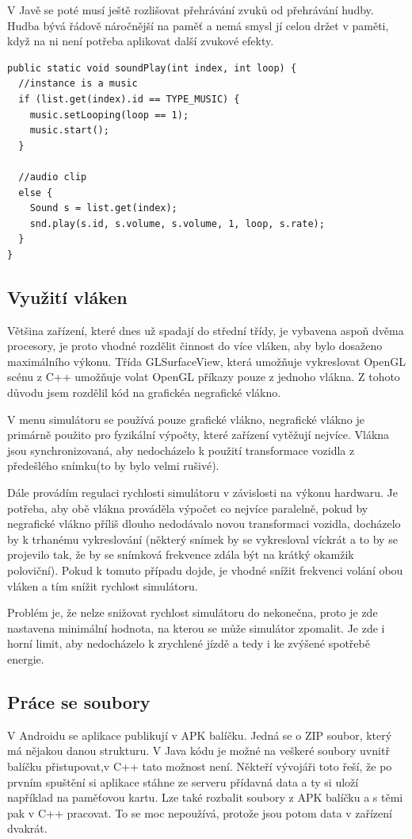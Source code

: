 \documentclass[11pt,twoside,a4paper]{book}
\begin{document}
V Javě se poté musí ještě rozlišovat přehrávání zvuků od přehrávání hudby. Hudba bývá řádově náročnější na paměť a nemá smysl jí celou držet v paměti, když na ni není potřeba aplikovat další zvukové efekty.

\lstset{language=Java} 
\begin{lstlisting}[caption=Přehrání zvuku v Javě pomocí Android API]  
public static void soundPlay(int index, int loop) {
  //instance is a music
  if (list.get(index).id == TYPE_MUSIC) {
    music.setLooping(loop == 1);
    music.start();
  }

  //audio clip
  else {
    Sound s = list.get(index);
    snd.play(s.id, s.volume, s.volume, 1, loop, s.rate);
  }
}
\end{lstlisting}

\subsection{Využití vláken}
Většina zařízení, které dnes už spadají do střední třídy, je vybavena aspoň dvěma procesory, je proto vhodné rozdělit činnost do více vláken, aby bylo dosaženo maximálního výkonu. Třída GLSurfaceView, která umožňuje vykreslovat OpenGL scénu z C++ umožňuje volat OpenGL příkazy pouze z jednoho vlákna. Z tohoto důvodu jsem rozdělil kód na grafické\linebreak a negrafické vlákno.

V menu simulátoru se používá pouze grafické vlákno, negrafické vlákno je primárně použito pro fyzikální výpočty, které zařízení vytěžují nejvíce. Vlákna jsou synchronizovaná, aby nedocházelo k použití transformace vozidla z předešlého snímku(to by bylo velmi rušivé).

Dále provádím regulaci rychlosti simulátoru v závislosti na výkonu hardwaru. Je potřeba, aby obě vlákna prováděla výpočet co nejvíce paralelně, pokud by negrafické vlákno příliš dlouho nedodávalo novou transformaci vozidla, docházelo by k trhanému vykreslování (některý snímek by se vykresloval víckrát a to by se projevilo tak, že by se snímková frekvence zdála být na krátký okamžik poloviční). Pokud k tomuto případu dojde, je vhodné snížit frekvenci volání obou vláken a tím snížit rychlost simulátoru.

Problém je, že nelze snižovat rychlost simulátoru do nekonečna, proto je zde nastavena minimální hodnota, na kterou se může simulátor zpomalit. Je zde i horní limit, aby nedocházelo k zrychlené jízdě a tedy i ke zvýšené spotřebě energie.

\subsection{Práce se soubory}
V Androidu se aplikace publikují v APK balíčku. Jedná se o ZIP soubor, který má nějakou danou strukturu. V Java kódu je možné na veškeré soubory uvnitř balíčku přistupovat,\linebreak v C++ tato možnost není. Někteří vývojáři toto řeší, že po prvním spuštění si aplikace stáhne ze serveru přídavná data a ty si uloží například na paměťovou kartu. Lze také rozbalit soubory z APK balíčku a s těmi pak v C++ pracovat. To se moc nepoužívá, protože jsou potom data v zařízení dvakrát.
\end{document}
